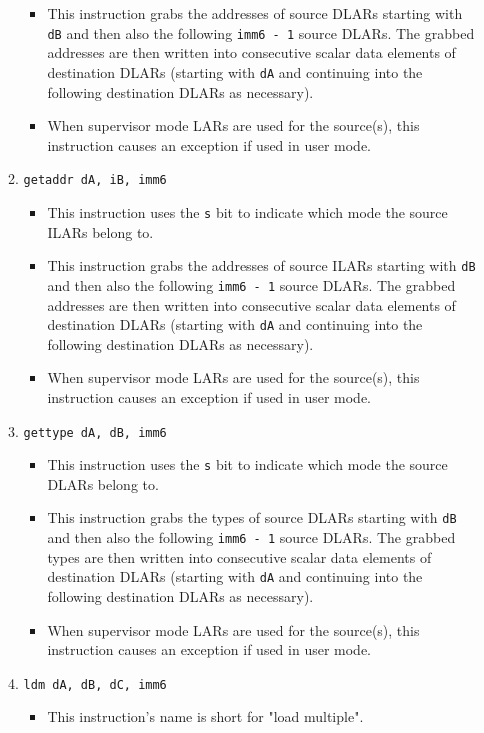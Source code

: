 \documentclass{article}
\begin{document}
\begin{itemize}
\begin{enumerate}
\begin{itemize}
				\item This instruction grabs the addresses of source DLARs
				starting with \texttt{dB} and then also the following
				\texttt{imm6 - 1} source DLARs. The grabbed addresses are
				then written into consecutive scalar data elements of
				destination DLARs (starting with \texttt{dA} and continuing
				into the following destination DLARs as necessary).

				\item When supervisor mode LARs are used for the source(s),
				this instruction causes an exception if used in user mode.
				\end{itemize}
			\item \texttt{getaddr dA, iB, imm6}
				\begin{itemize}
				\item This instruction uses the \texttt{s} bit to indicate
				which mode the source ILARs belong to.

				\item This instruction grabs the addresses of source ILARs
				starting with \texttt{dB} and then also the following
				\texttt{imm6 - 1} source DLARs. The grabbed addresses are
				then written into consecutive scalar data elements of
				destination DLARs (starting with \texttt{dA} and continuing
				into the following destination DLARs as necessary).

				\item When supervisor mode LARs are used for the source(s),
				this instruction causes an exception if used in user mode.
				\end{itemize}
			\item \texttt{gettype dA, dB, imm6}
				\begin{itemize}
				\item This instruction uses the \texttt{s} bit to indicate
				which mode the source DLARs belong to.

				\item This instruction grabs the types of source DLARs
				starting with \texttt{dB} and then also the following
				\texttt{imm6 - 1} source DLARs. The grabbed types are then
				written into consecutive scalar data elements of
				destination DLARs (starting with \texttt{dA} and continuing
				into the following destination DLARs as necessary).

				\item When supervisor mode LARs are used for the source(s),
				this instruction causes an exception if used in user mode.
				\end{itemize}
			\item \texttt{ldm dA, dB, dC, imm6}
				\begin{itemize}
				\item This instruction's name is short for "load multiple".


\end{itemize}
\end{enumerate}
\end{itemize}
\end{document}
